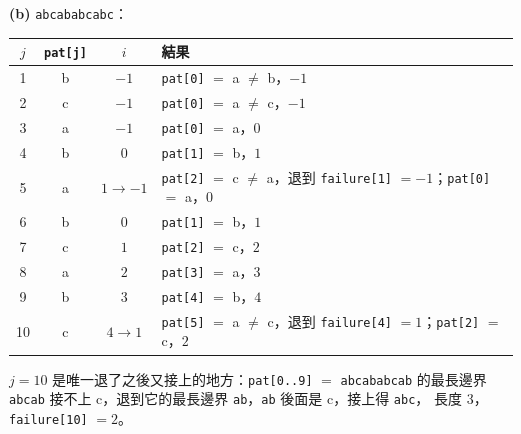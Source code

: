 \begin{pastsoln}
\textbf{(b)} \texttt{abcababcabc}：
\begin{center}
\small
\begin{tabular}{cccl}
\toprule
$j$ & \texttt{pat[j]} & $i$ & 結果 \\
\midrule
1 & b & $-1$ & \texttt{pat[0]} $=$ a $\ne$ b，$-1$ \\
2 & c & $-1$ & \texttt{pat[0]} $=$ a $\ne$ c，$-1$ \\
3 & a & $-1$ & \texttt{pat[0]} $=$ a，$0$ \\
4 & b & $0$ & \texttt{pat[1]} $=$ b，$1$ \\
5 & a & $1 \to -1$ & \texttt{pat[2]} $=$ c $\ne$ a，退到 \texttt{failure[1]} $= -1$；\texttt{pat[0]} $=$ a，$0$ \\
6 & b & $0$ & \texttt{pat[1]} $=$ b，$1$ \\
7 & c & $1$ & \texttt{pat[2]} $=$ c，$2$ \\
8 & a & $2$ & \texttt{pat[3]} $=$ a，$3$ \\
9 & b & $3$ & \texttt{pat[4]} $=$ b，$4$ \\
10 & c & $4 \to 1$ & \texttt{pat[5]} $=$ a $\ne$ c，退到 \texttt{failure[4]} $= 1$；\texttt{pat[2]} $=$ c，$2$ \\
\bottomrule
\end{tabular}
\end{center}
$j = 10$ 是唯一退了之後又接上的地方：\texttt{pat[0..9]} $=$ \texttt{abcababcab} 的最長邊界
\texttt{abcab} 接不上 c，退到它的最長邊界 \texttt{ab}，\texttt{ab} 後面是 c，接上得 \texttt{abc}，
長度 $3$，\texttt{failure[10]} $= 2$。
\end{pastsoln}
